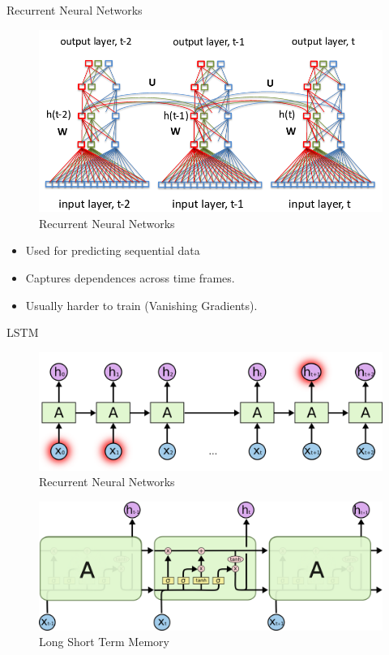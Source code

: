 ﻿\documentclass[table,aspectratio=43,mathserif,xcolor={usenames,dvipsnames,svgnames,table},10pt]{beamer}
\begin{document}
\begin{frame}{Recurrent Neural Networks}
\begin{figure}[h]
    \includegraphics[width=0.7\linewidth]{images/rnn.png}  
    \caption{Recurrent Neural Networks}
  \end{figure}
  
\begin{itemize}
\item<+-> Used for predicting sequential data 
\item<+-> Captures dependences across time frames.
\item<+-> Usually harder to train (Vanishing Gradients).
\end{itemize}

\end{frame}


\begin{frame}{LSTM}
 \begin{figure}[h]
    \includegraphics[width=0.4\linewidth]{images/rnn_n.png}  
    \caption{Recurrent Neural Networks}
  \end{figure}
   \begin{figure}[h]
    \includegraphics[width=0.6\linewidth]{images/lstm.png}  
    \caption{Long Short Term Memory}
  \end{figure}
\end{frame}
\end{document}
